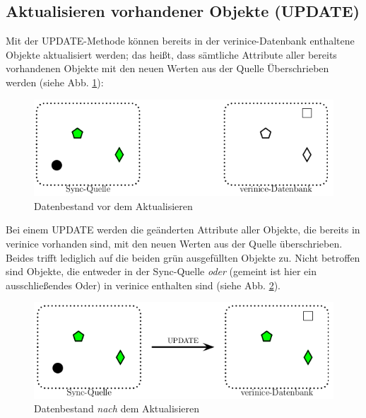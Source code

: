 \documentclass[a4paper,10pt]{book}
\begin{document}
\subsection{Aktualisieren vorhandener Objekte (UPDATE)}
Mit der \textsc{UPDATE}-Methode können bereits in der verinice-Datenbank enthaltene Objekte aktualisiert
werden; das heißt, dass sämtliche Attribute aller bereits vorhandenen Objekte mit den neuen
Werten aus der Quelle Überschrieben werden (siehe Abb. \ref{Datenbestand vor dem Aktualisieren}):
\newline
\begin{figure}[htb!]
  \centering
  \includegraphics[scale=.7]{Screenshot/SyncAPI_pre_UPDATE.png}
  \caption{\label{Datenbestand vor dem Aktualisieren} Datenbestand vor dem Aktualisieren}
\end{figure}
\newline
Bei einem \textsc{UPDATE} werden die geänderten Attribute aller Objekte, die bereits in verinice vorhanden
sind, mit den neuen Werten aus der Quelle überschrieben. Beides trifft lediglich auf die beiden
grün ausgefüllten Objekte zu. Nicht betroffen sind Objekte, die entweder in der Sync-Quelle
\textit{oder} (gemeint ist hier ein ausschließendes Oder) in verinice enthalten sind (siehe Abb. \ref{Datenbestand nach dem Aktualisieren}).
\newline
\begin{figure}[htb!]
  \centering
  \includegraphics[scale=.7]{Screenshot/SyncAPI_post_UPDATE.png}
  \caption{\label{Datenbestand nach dem Aktualisieren} Datenbestand \textit{nach} dem Aktualisieren}
\end{figure}
\newline
\end{document}
